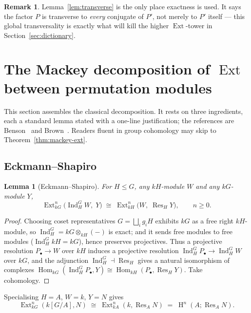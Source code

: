 \documentclass[11pt]{amsart}
\theoremstyle{plain}
\newtheorem{lemma}[theorem]{Lemma}
\theoremstyle{definition}
\newtheorem{remark}[theorem]{Remark}
\DeclareMathOperator{\Ind}{Ind}
\DeclareMathOperator{\Res}{Res}
\DeclareMathOperator{\Hom}{Hom}
\DeclareMathOperator{\Ext}{Ext}
\DeclareMathOperator{\Hh}{H}
\begin{document}
\begin{remark}
Lemma~\ref{lem:transverse} is the only place exactness is used. It says the factor $P$ is
transverse to \emph{every} conjugate of $P'$, not merely to $P'$ itself --- this global
transversality is exactly what will kill the higher $\Ext$-tower in Section~\ref{sec:dictionary}.
\end{remark}

\section{The Mackey decomposition of $\Ext$ between permutation modules}\label{sec:mackey}

This section assembles the classical decomposition. It rests on three ingredients, each a
standard lemma stated with a one-line justification; the references are
Benson~\cite[\S2.8,\ \S3.3]{benson1} and Brown~\cite[III.5--III.6]{brown}. Readers fluent in
group cohomology may skip to Theorem~\ref{thm:mackey-ext}.

\subsection{Eckmann--Shapiro}
\begin{lemma}[Eckmann--Shapiro]\label{lem:shapiro}
For $H\le G$, any $kH$-module $W$ and any $kG$-module $Y$,
\[
   \Ext^n_{kG}\!\bigl(\Ind_H^G W,\;Y\bigr)\;\cong\;\Ext^n_{kH}\!\bigl(W,\;\Res_H Y\bigr),
   \qquad n\ge 0.
\]
\end{lemma}
\begin{proof}
Choosing coset representatives $G=\bigsqcup_i g_i H$ exhibits $kG$ as a free right
$kH$-module, so $\Ind_H^G=kG\otimes_{kH}(-)$ is exact; and it sends free modules to free
modules ($\Ind_H^G kH=kG$), hence preserves projectives. Thus a projective resolution
$P_\bullet\to W$ over $kH$ induces a projective resolution $\Ind_H^G P_\bullet\to\Ind_H^G W$
over $kG$, and the adjunction $\Ind_H^G\dashv\Res_H$ gives a natural isomorphism of
complexes $\Hom_{kG}(\Ind_H^G P_\bullet,Y)\cong\Hom_{kH}(P_\bullet,\Res_H Y)$. Take
cohomology.
\end{proof}

Specialising $H=A$, $W=k$, $Y=N$ gives
\begin{equation}\label{eq:shapiro-spec}
   \Ext^n_{kG}(k[G/A],N)\;\cong\;\Ext^n_{kA}(k,\Res_A N)\;=\;\Hh^n(A;\Res_A N).
\end{equation}
\end{document}
